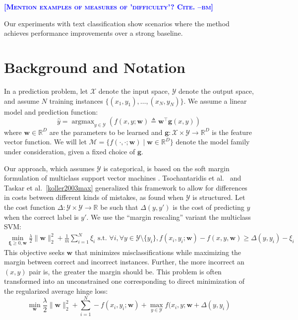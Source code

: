 \documentclass{article} %
\DeclareMathOperator*{\argmax}{argmax}
\newcommand{\bmcomment}[1]{\textcolor{blue}{\textsc{\textbf{[#1 --bm]}}}}
\begin{document}
\bmcomment{Mention examples of measures of 'difficulty'? Cite.}



Our experiments with text classification show  scenarios where the method achieves
performance improvements over a strong baseline.


\section{Background and Notation}

In a prediction problem, let $\mathcal{X}$ denote the input space,
$\mathcal{Y}$ denote the output space, and assume $N$ training
instances $\{(x_1, y_1), \ldots, (x_N, y_N)\}$.  We assume a linear
model and prediction function:
\begin{equation}
\hat{y} = \argmax_{y \in \mathcal{Y}} \left(f(x, y;\mathbf{w}) \triangleq \mathbf{w}^\top \mathbf{g}(x, y) \right)
\end{equation}
where $\mathbf{w} \in \mathbb{R}^D$ are the parameters to be learned
and $\mathbf{g} : \mathcal{X} \times \mathcal{Y} \rightarrow
\mathbb{R}^D$ is the feature vector function.  We will let
$\mathcal{M} =\{f(\cdot,\cdot;\mathbf{w}) \mid \mathbf{w} \in
\mathbb{R}^D\}$ denote the model family under consideration, given a
fixed choice of $\mathbf{g}$.

Our approach, which assumes $\mathcal{Y}$ is categorical, is based on
the soft margin formulation of multiclass support vector machines
\citep{vapnik1998statistical,crammer2002algorithmic,weston1998multi}.
Tsochantaridis et al.~\citep{tsochantaridis2004support} and Taskar et
al.~\ref{koller2003max} generalized this framework to allow for
differences in costs between different kinds of mistakes, as found
when $\mathcal{Y}$ is structured.  Let the cost function
$\Delta:\mathcal{Y}\times\mathcal{Y}\rightarrow\mathbb{R}$  be such
that $\Delta(y, y')$ is the cost of predicting $y$ when the correct
label is $y'$.  We use the ``margin rescaling'' variant the multiclass SVM:
\begin{align}
 \min_{\boldsymbol{\xi}\geq 0, \mathbf{w}}
\frac{\lambda}{2}\|\mathbf{w}\|_2^2+\frac{1}{m}\sum_{i=1}^N\xi_i 
 \text{\ \ \ s.t.\ \ \ } \forall i,  \forall y \in \mathcal{Y} \setminus
 \{y_i\},  f(x_i, y_i; \mathbf{w}) - f(x, y, \mathbf{w}) \geq
 \Delta(y, y_i) - \xi_i \label{marginRescaling}
\end{align}
This objective seeks $\mathbf{w}$ that minimizes misclassifications while
maximizing the margin between correct and incorrect instances.
Further, the more incorrect an $(x,y)$ pair is, the greater the margin
should be.  This problem is often transformed into an unconstrained
one corresponding to direct minimization of the regularized average
hinge loss:
\begin{equation}
\label{svmObjective}
\min_{\mathbf{w}} \frac{\lambda}{2}\|\mathbf{w}\|_2^2 +
\sum_{i=1}^N  -f(x_i, y_i; \mathbf{w}) + \max_{y \in \mathcal{Y}}
  f(x_i, y; \mathbf{w} + \Delta(y, y_i)
\end{equation}
\end{document}
